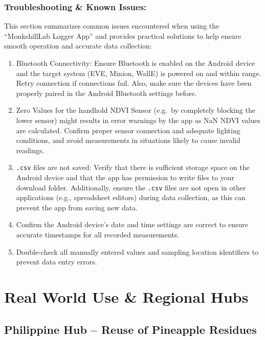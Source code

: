 \documentclass[
  11pt,
  letterpaper,
]{book}
\providecommand{\tightlist}{%
  \setlength{\itemsep}{0pt}\setlength{\parskip}{0pt}}
\begin{document}
\subsection{Troubleshooting \& Known
Issues:}\label{sec-monkshilllab-app-troubleshooting}

This section summarizes common issues encountered when using the
``MonkshillLab Logger App'' and provides practical solutions to help
ensure smooth operation and accurate data collection:

\begin{enumerate}
\def\labelenumi{\arabic{enumi}.}
\tightlist
\item
  Bluetooth Connectivity: Ensure Bluetooth is enabled on the Android
  device and the target system (EVE, Minion, WallE) is powered on and
  within range. Retry connection if connections fail. Also, make sure
  the devices have been properly paired in the Android Bluetooth
  settings before.
\item
  Zero Values for the handhold NDVI Sensor (e.g.~by completely blocking
  the lower sensor) might results in error warnings by the app as NaN
  NDVI values are calculated. Confirm proper sensor connection and
  adequate lighting conditions, and avoid measurements in situations
  likely to cause invalid readings.
\item
  \texttt{.csv} files are not saved: Verify that there is sufficient
  storage space on the Android device and that the app has permission to
  write files to your download folder. Additionally, ensure the
  \texttt{.csv} files are not open in other applications (e.g.,
  spreadsheet editors) during data collection, as this can prevent the
  app from saving new data.
\item
  Confirm the Android device's date and time settings are correct to
  ensure accurate timestamps for all recorded measurements.
\item
  Double-check all manually entered values and sampling location
  identifiers to prevent data entry errors.
\end{enumerate}


\chapter{Real World Use \& Regional
Hubs}\label{real-world-use-regional-hubs}

\section{Philippine Hub -- Reuse of Pineapple
Residues}\label{philippine-hub-reuse-of-pineapple-residues}
\end{document}
